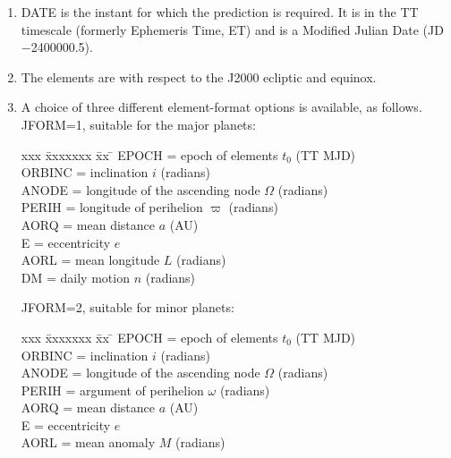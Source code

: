 \documentclass[11pt,twoside]{article}
\begin{document}
{
 \begin{enumerate}
  \item DATE is the instant for which the prediction is required.  It is
        in the TT timescale (formerly Ephemeris Time, ET) and is a
        Modified Julian Date (JD$-$2400000.5).
  \item The elements are with respect to the J2000 ecliptic and equinox.
  \item A choice of three different element-format options is available, as
        follows. \\

        JFORM=1, suitable for the major planets:

        \begin{tabbing}
        xxx \= xxxxxxx \= xx \= \kill
        \> EPOCH  \> = \> epoch of elements $t_0$ (TT MJD) \\
        \> ORBINC \> = \> inclination $i$ (radians) \\
        \> ANODE  \> = \> longitude of the ascending node $\Omega$ (radians) \\
        \> PERIH  \> = \> longitude of perihelion $\varpi$ (radians) \\
        \> AORQ   \> = \> mean distance $a$ (AU) \\
        \> E      \> = \> eccentricity $e$ \\
        \> AORL   \> = \> mean longitude $L$ (radians) \\
        \> DM     \> = \> daily motion $n$ (radians)
        \end{tabbing}

        JFORM=2, suitable for minor planets:

        \begin{tabbing}
        xxx \= xxxxxxx \= xx \= \kill
        \> EPOCH  \> = \> epoch of elements $t_0$ (TT MJD) \\
        \> ORBINC \> = \> inclination $i$ (radians) \\
        \> ANODE  \> = \> longitude of the ascending node $\Omega$ (radians) \\
        \> PERIH  \> = \> argument of perihelion $\omega$ (radians) \\
        \> AORQ   \> = \> mean distance $a$ (AU) \\
        \> E      \> = \> eccentricity $e$ \\
        \> AORL   \> = \> mean anomaly $M$ (radians)
        \end{tabbing}


\end{enumerate}}
\end{document}
